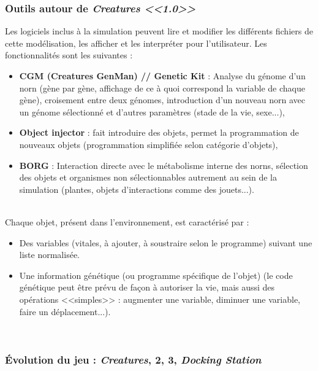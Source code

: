 \documentclass[11pt,twoside,a4paper]{article}
\begin{document}
\subsubsection{Outils autour de \textit{Creatures <<1.0>>}}

Les logiciels inclus {\`a} la simulation peuvent lire et modifier les diff{\'e}rents fichiers de cette mod{\'e}lisation, les afficher et les interpr{\'e}ter pour l'utilisateur. Les fonctionnalit{\'e}s sont les suivantes :
\begin{itemize}
	\item \textbf{CGM (Creatures GenMan) // Genetic Kit} : Analyse du g{\'e}nome d'un norn (g{\`e}ne par g{\`e}ne, affichage de ce {\`a} quoi correspond la variable de chaque g{\`e}ne), croisement entre deux g{\'e}nomes, introduction d'un nouveau norn avec un g{\'e}nome s{\'e}lectionn{\'e} et d'autres param{\`e}tres (stade de la vie, sexe...), 
	\item \textbf{Object injector} : fait introduire des objets, permet la programmation de nouveaux objets (programmation simplifi{\'e}e selon cat{\'e}gorie d'objets), 
	\item \textbf{BORG} : Interaction directe avec le m{\'e}tabolisme interne des norns, s{\'e}lection des objets et organismes non s{\'e}lectionnables autrement au sein de la simulation (plantes, objets d'interactions comme des jouets...). 
\end{itemize}~\\

Chaque objet, pr{\'e}sent dans l'environnement, est caract{\'e}ris{\'e} par :
\begin{itemize}
	\item Des variables (vitales, {\`a} ajouter, {\`a} soustraire selon le programme) suivant une liste normalis{\'e}e. 
	\item Une information g{\'e}n{\'e}tique (ou programme sp{\'e}cifique de l'objet) (le code g{\'e}n{\'e}tique peut {\^e}tre pr{\'e}vu de fa\c{c}on {\`a} autoriser la vie, mais aussi des op{\'e}rations <<simples>> : augmenter une variable, diminuer une variable, faire un d{\'e}placement...). %
\end{itemize}~\\

\subsubsection{{\'E}volution du jeu : \textit{Creatures}, 2, 3, \textit{Docking Station}}
\end{document}
